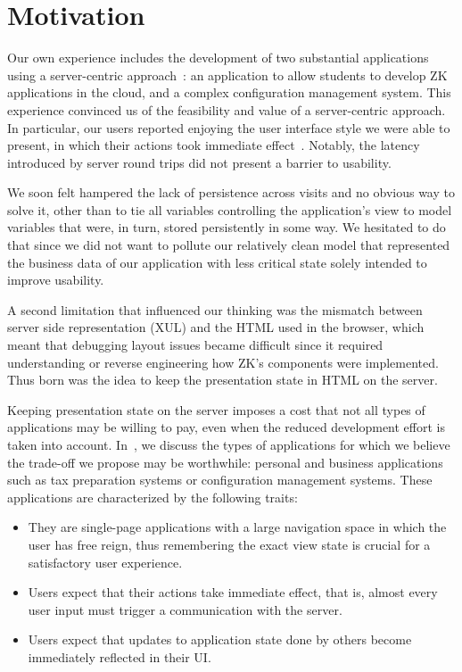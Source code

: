\section{Motivation}
\label{sec:moti}

Our own experience includes the development of two substantial applications
using a server-centric approach~\cite{tilothesis,EdwardsBack:csc2011}:
an application to allow students to develop ZK applications in the cloud, and
a complex configuration management system.  This experience convinced
us of the feasibility and value of a server-centric approach.  In particular,
our users reported enjoying the user interface style we were able to
present, in which their actions took immediate effect~\cite{BaileyBack:igi2013}.
Notably, the latency introduced by server round trips did not present a
barrier to usability.

We soon felt hampered the lack of persistence across visits and no obvious way 
to solve it, other than to tie all variables controlling the application's
view to model variables that were, in turn, stored persistently in some way.
We hesitated to do that since we did not want to pollute our relatively clean
model that represented the business data of our application with less 
critical state solely intended to improve usability.

A second limitation that influenced our thinking was the mismatch between
server side representation (XUL) and the HTML used in the browser, which meant
that debugging layout issues became difficult since it required understanding
or reverse engineering how ZK's components were implemented.
Thus born was the idea to keep the presentation state in HTML on the server.

Keeping presentation state on the server imposes a cost that not all
types of applications may be willing to pay, even when the reduced development
effort is taken into account.  In~\cite{mcdaniel2012cloudbrowser}, we
discuss the types of applications for which we believe the trade-off we propose
may be worthwhile: personal and business applications such as tax preparation systems
or configuration management systems.  These applications are characterized by the following
traits:
\begin{itemize}
\item They are single-page applications with a large navigation space in which the
    user has free reign, thus remembering the exact view state is crucial for
    a satisfactory user experience.
\item Users expect that their actions take immediate effect, that is, almost every
    user input must trigger a communication with the server.
\item Users expect that updates to application state done by others become immediately
    reflected in their UI.
\end{itemize}

